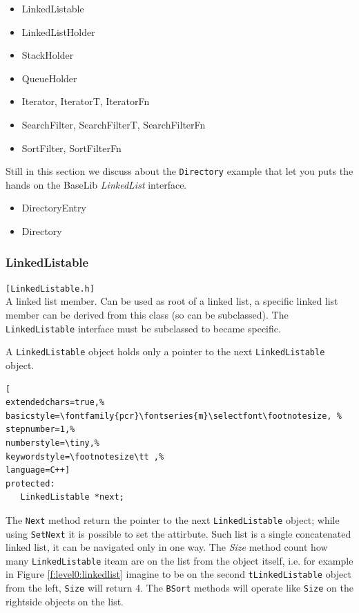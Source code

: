 \begin{itemize}
 \item LinkedListable

 \item LinkedListHolder
 \item StackHolder
 \item QueueHolder

 \item Iterator, IteratorT, IteratorFn
 \item SearchFilter, SearchFilterT, SearchFilterFn
 \item SortFilter, SortFilterFn
\end{itemize}

Still in this section we discuss about the \texttt{Directory} example that let you puts the hands on the BaseLib \textit{LinkedList} interface.

\begin{itemize}
 \item DirectoryEntry
 \item Directory
\end{itemize}



\subsubsection{LinkedListable}
\texttt{[LinkedListable.h]}\\
 A linked list member. Can be used as root of a linked list, a specific linked list member can be derived from this class (so can be subclassed). The \texttt{LinkedListable} interface must be subclassed to became specific.

A \texttt{LinkedListable} object holds only a pointer to the next \texttt{LinkedListable} object.

\begin{lstlisting}[
extendedchars=true,%
basicstyle=\fontfamily{pcr}\fontseries{m}\selectfont\footnotesize, %
stepnumber=1,%
numberstyle=\tiny,%
keywordstyle=\footnotesize\tt ,%
language=C++]
protected:
   LinkedListable *next;
\end{lstlisting}

The \texttt{Next} method return the pointer to the next \texttt{LinkedListable} object; while using \texttt{SetNext} it is possible to set the attirbute. Such list is a single concatenated linked list, it can be navigated only in one way. The \textit{Size} method count how many \texttt{LinkedListable} iteam are on the list from the object itself, i.e. for example in Figure \ref{f:level0:linkedlist} imagine to be on the second \texttt{tLinkedListable} object from the left, \texttt{Size} will return 4.
The \texttt{BSort} methods will operate like \texttt{Size} on the rightside objects on the list.


